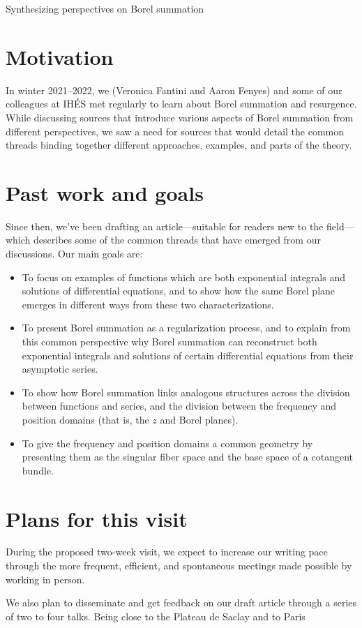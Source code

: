 \documentclass{article}[a4paper]
\begin{document}
\begin{center}
\Large Synthesizing perspectives on Borel summation
\end{center}

\section*{Motivation}
In winter 2021--2022, we (Veronica Fantini and Aaron Fenyes) and some of our colleagues at IH\'{E}S met regularly to learn about Borel summation and resurgence. While discussing sources that introduce various aspects of Borel summation from different perspectives, we saw a need for sources that would detail the common threads binding together different approaches, examples, and parts of the theory.
\section*{Past work and goals}
Since then, we've been drafting an article---suitable for readers new to the field---which describes some of the common threads that have emerged from our discussions. Our main goals are:

\begin{itemize}
\item To focus on examples of functions which are both exponential integrals and solutions of differential equations, and to show how the same Borel plane emerges in different ways from these two characterizations.
\item To present Borel summation as a regularization process, and to explain from this common perspective why Borel summation can reconstruct both exponential integrals and solutions of certain differential equations from their asymptotic series.
\item To show how Borel summation links analogous structures across the division between functions and series, and the division between the frequency and position domains (that is, the $z$ and Borel planes).
\item To give the frequency and position domains a common geometry by presenting them as the singular fiber space and the base space of a cotangent bundle.
\end{itemize}
\section*{Plans for this visit}
During the proposed two-week visit, we expect to increase our writing pace through the more frequent, efficient, and spontaneous meetings made possible by working in person.

We also plan to disseminate and get feedback on our draft article through a series of two to four talks. Being close to the Plateau de Saclay and to Paris
\end{document}
